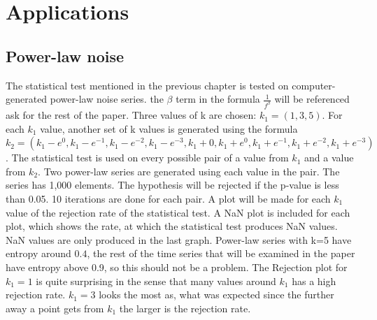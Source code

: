 \chapter{Applications}
\section{Power-law noise}
The statistical test mentioned in the previous chapter is tested on computer-generated power-law noise series.\cite{Timmer1995} the $\beta$ term in the formula $\frac{1}{f^{\beta}}$ will be referenced ask for the rest of the paper. Three values of k are chosen: $k_1=(1,3,5)$. For each $k_1$ value, another set of k values is generated using the formula $k_2=(k_1-e^0,k_1-e^{-1},k_1-e^{-2},k_1-e^{-3},k_1+0,k_1+e^0,k_1+e^{-1},k_1+e^{-2},k_1+e^{-3})$. The statistical test is used on every possible pair of a value from $k_1$ and a value from $k_2$. Two power-law series are generated using each value in the pair. The series has 1,000 elements. The hypothesis will be rejected if the p-value is less than 0.05. 10 iterations are done for each pair. A plot will be made for each $k_1$ value of the rejection rate of the statistical test. A NaN plot is included for each plot, which shows the rate, at which the statistical test produces NaN values. NaN values are only produced in the last graph. Power-law series with k=5 have entropy around $0.4$, the rest of the time series that will be examined in the paper have entropy above 0.9, so this should not be a problem. The Rejection plot for $k_1=1$ is quite surprising in the sense that many values around $k_1$ has a high rejection rate. $k_1=3$ looks the most as, what was expected since the further away a point gets from $k_1$ the larger is the rejection rate.



